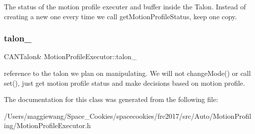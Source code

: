 The status of the motion profile executer and buffer inside the Talon. Instead of creating a new one every time we call get\+Motion\+Profile\+Status, keep one copy. \mbox{\label{class_motion_profile_executor_af9d5579de49093673fac4e35819e7e0f}} 
\subsubsection{\texorpdfstring{talon\+\_\+}{talon\_}}
{\footnotesize\ttfamily C\+A\+N\+Talon\& Motion\+Profile\+Executor\+::talon\+\_\+}

reference to the talon we plan on manipulating. We will not change\+Mode() or call set(), just get motion profile status and make decisions based on motion profile. 

The documentation for this class was generated from the following file\+:\begin{DoxyCompactItemize}
\item 
/\+Users/maggiewang/\+Space\+\_\+\+Cookies/spacecookies/frc2017/src/\+Auto/\+Motion\+Profiling/Motion\+Profile\+Executor.\+h\end{DoxyCompactItemize}
